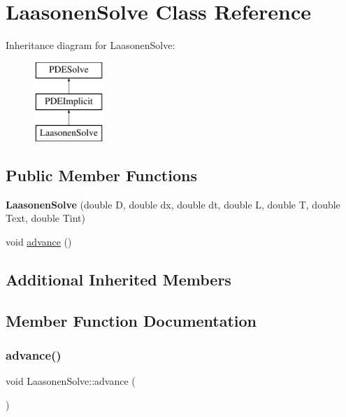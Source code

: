 \hypertarget{class_laasonen_solve}{}\section{Laasonen\+Solve Class Reference}
\label{class_laasonen_solve}
Inheritance diagram for Laasonen\+Solve\+:\begin{figure}[H]
\begin{center}
\leavevmode
\includegraphics[height=3.000000cm]{class_laasonen_solve}
\end{center}
\end{figure}
\subsection*{Public Member Functions}
\begin{DoxyCompactItemize}
\item 
\mbox{\label{class_laasonen_solve_afee5334bc58eaf72c312d73ff3e8829c}} 
{\bfseries Laasonen\+Solve} (double D, double dx, double dt, double L, double T, double Text, double Tint)
\item 
void \hyperlink{class_laasonen_solve_af320ccb100c388621052d2a2cb57858a}{advance} ()
\end{DoxyCompactItemize}
\subsection*{Additional Inherited Members}


\subsection{Member Function Documentation}
\mbox{\label{class_laasonen_solve_af320ccb100c388621052d2a2cb57858a}} 
\subsubsection{\texorpdfstring{advance()}{advance()}}
{\footnotesize\ttfamily void Laasonen\+Solve\+::advance (\begin{DoxyParamCaption}{ }\end{DoxyParamCaption})\hspace{0.3cm}{\ttfamily [virtual]}}

